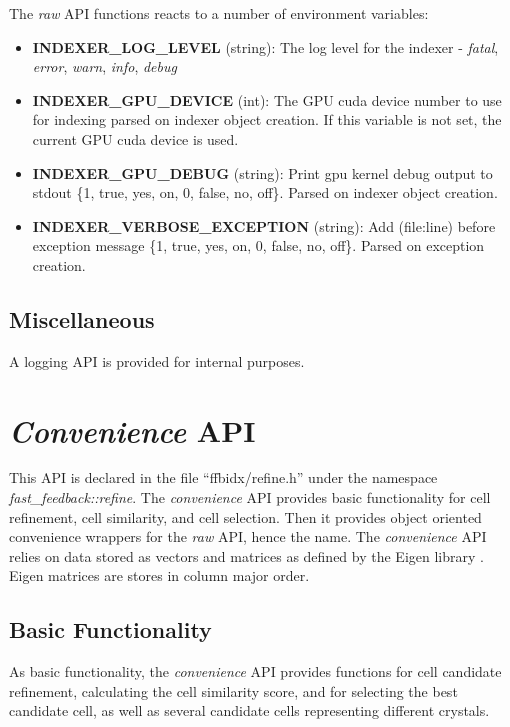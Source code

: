 \documentclass[a4paper,10pt]{article}
\begin{document}
The \emph{raw} API functions reacts to a number of environment variables:
%
\begin{itemize}
 \item \textbf{INDEXER\_LOG\_LEVEL} (string): The log level for the indexer - \emph{fatal}, \emph{error}, \emph{warn}, \emph{info}, \emph{debug}
 \item \textbf{INDEXER\_GPU\_DEVICE} (int): The GPU cuda device number to use for indexing parsed on indexer object creation. If this variable is not set, the current GPU cuda device is used.
 \item \textbf{INDEXER\_GPU\_DEBUG} (string): Print gpu kernel debug output to stdout \{1, true, yes, on, 0, false, no, off\}. Parsed on indexer object creation.
 \item \textbf{INDEXER\_VERBOSE\_EXCEPTION} (string): Add (file:line) before exception message \{1, true, yes, on, 0, false, no, off\}. Parsed on exception creation.
\end{itemize}

\subsection{Miscellaneous}

A logging API is provided for internal purposes.

\section{\emph{Convenience} API}

This API is declared in the file ``ffbidx/refine.h'' under the namespace \emph{fast\_feed\-back::re\-fine}. The \emph{convenience} API provides basic functionality for cell refinement, cell similarity, and cell selection. Then it provides object oriented convenience wrappers for the \emph{raw} API, hence the name. The \emph{convenience} API relies on data stored as vectors and matrices as defined by the Eigen library \cite{eigenweb}. Eigen matrices are stores in column major order.

\subsection{Basic Functionality}

As basic functionality, the \emph{convenience} API provides functions for cell candidate refinement, calculating the cell similarity score, and for selecting the best candidate cell, as well as several candidate cells representing different crystals.
\end{document}

